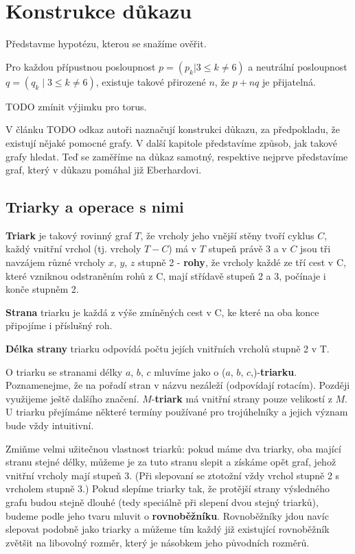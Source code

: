 
\chapter{Konstrukce důkazu}

Představme hypotézu, kterou se snažíme ověřit.
\begin{hypot}\label{veta02:1}
Pro každou přípustnou posloupnost $p=(p_k | 3 \leq k \neq 6)$ a neutrální posloupnost $q=(q_k \mid 3 \leq k \neq 6)$, existuje takové přirozené $n$, že $p+nq$ je přijatelná.
\end{hypot}

TODO zmínit výjimku pro torus.

V článku TODO odkaz autoři naznačují konstrukci důkazu, za předpokladu, že existují nějaké pomocné grafy. V další kapitole představíme způsob, jak takové grafy hledat. Teď se zaměříme na důkaz samotný, respektive nejprve představíme graf, který v důkazu pomáhal již Eberhardovi.

\section{Triarky a operace s nimi}

\begin{definice}[Triark]\label{def02:1}
\textbf{Triark} je takový rovinný graf $T$, že vrcholy jeho vnější stěny tvoří cyklus $C$, každý vnitřní vrchol (tj. vrcholy $T-C$) má v $T$ stupeň právě 3 a v $C$ jsou tři navzájem různé vrcholy $x$, $y$, $z$ stupně 2 - \textbf{rohy}, že vrcholy každé ze tří cest v C, které vzniknou odstraněním rohů z C, mají střídavě stupeň 2 a 3, počínaje i konče stupněm 2.
\end{definice}

\textbf{Strana} triarku je každá z výše zmíněných cest v C, ke které na oba konce připojíme i příslušný roh.

\textbf{Délka strany} triarku odpovídá počtu jejích vnitřních vrcholů stupně 2 v T.

O triarku se stranami délky $a$, $b$, $c$ mluvíme jako o ($a$, $b$, $c$,)-\textbf{triarku}. Poznamenejme, že na pořadí stran v názvu nezáleží (odpovídají rotacím).
Později využijeme ještě dalšího značení. $M$-\textbf{triark} má vnitřní strany pouze velikostí z $M$. U triarku přejímáme některé termíny používané pro trojúhelníky a jejich význam bude vždy intuitivní.

Zmiňme velmi užitečnou vlastnost triarků: pokud máme dva triarky, oba mající stranu stejné délky, můžeme je za tuto stranu slepit a získáme opět graf, jehož vnitřní vrcholy mají stupeň 3. (Při slepovaní se ztotožní vždy vrchol stupně 2 s vrcholem stupně 3.) Pokud slepíme triarky tak, že protější strany výsledného grafu budou stejně dlouhé (tedy speciálně při slepení dvou stejný triarků), budeme podle jeho tvaru mluvit o \textbf{rovnoběžníku}. Rovnoběžníky jdou navíc slepovat podobně jako triarky a můžeme tím každý již existující rovnoběžník zvětšit na libovolný rozměr, který je násobkem jeho původních rozměrů.



